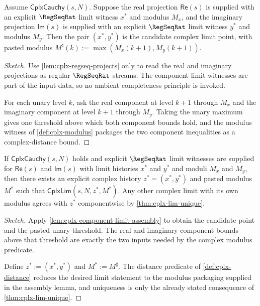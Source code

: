 \begin{lemma}
\label{lem:cplx-component-limit-assembly}
Assume $\mathsf{CplxCauchy}(s, N)$. Suppose the real projection $\mathsf{Re}(s)$ is supplied with an explicit $\RegSeqRat$ limit witness $x^*$ and modulus $M_x$, and the imaginary projection $\mathsf{Im}(s)$ is supplied with an explicit $\RegSeqRat$ limit witness $y^*$ and modulus $M_y$. Then the pair $(x^*, y^*)$ is the candidate complex limit point, with pasted modulus $M^\sharp(k) := \max(M_x(k+1), M_y(k+1))$.
\end{lemma}
\begin{proof}[Sketch]
Use \autoref{lem:cplx-regseq-projects} only to read the real and imaginary projections as regular $\RegSeqRat$ streams. The component limit witnesses are part of the input data, so no ambient completeness principle is invoked.

For each unary level $k$, ask the real component at level $k+1$ through $M_x$ and the imaginary component at level $k+1$ through $M_y$. Taking the unary maximum gives one threshold above which both component bounds hold, and the modulus witness of \autoref{def:cplx-modulus} packages the two component inequalities as a complex-distance bound.
\end{proof}

\begin{theorem}
\label{thm:cplx-limit-from-component-limits}
If $\mathsf{CplxCauchy}(s, N)$ holds and explicit $\RegSeqRat$ limit witnesses are supplied for $\mathsf{Re}(s)$ and $\mathsf{Im}(s)$ with limit histories $x^*$ and $y^*$ and moduli $M_x$ and $M_y$, then there exists an explicit complex history $z^* = (x^*, y^*)$ and pasted modulus $M^*$ such that $\mathsf{CplxLim}(s, N, z^*, M^*)$. Any other complex limit with its own modulus agrees with $z^*$ componentwise by \autoref{thm:cplx-lim-unique}.
\end{theorem}
\begin{proof}[Sketch]
Apply \autoref{lem:cplx-component-limit-assembly} to obtain the candidate point and the pasted unary threshold. The real and imaginary component bounds above that threshold are exactly the two inputs needed by the complex modulus predicate.

Define $z^* := (x^*, y^*)$ and $M^* := M^\sharp$. The distance predicate of \autoref{def:cplx-distance} reduces the desired limit statement to the modulus packaging supplied in the assembly lemma, and uniqueness is only the already stated consequence of \autoref{thm:cplx-lim-unique}.
\end{proof}
